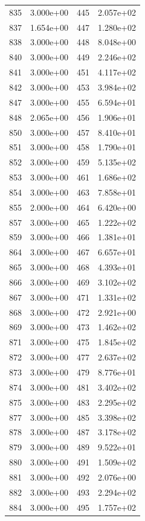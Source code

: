 \documentclass[12pt]{article}
\begin{document}
\begin{longtable}{@{}cccc@{}}
835 & 3.000e+00 & 445 & 2.057e+02 \\
837 & 1.654e+00 & 447 & 1.280e+02 \\
838 & 3.000e+00 & 448 & 8.048e+00 \\
840 & 3.000e+00 & 449 & 2.246e+02 \\
841 & 3.000e+00 & 451 & 4.117e+02 \\
842 & 3.000e+00 & 453 & 3.984e+02 \\
847 & 3.000e+00 & 455 & 6.594e+01 \\
848 & 2.065e+00 & 456 & 1.906e+01 \\
850 & 3.000e+00 & 457 & 8.410e+01 \\
851 & 3.000e+00 & 458 & 1.790e+01 \\
852 & 3.000e+00 & 459 & 5.135e+02 \\
853 & 3.000e+00 & 461 & 1.686e+02 \\
854 & 3.000e+00 & 463 & 7.858e+01 \\
855 & 2.000e+00 & 464 & 6.420e+00 \\
857 & 3.000e+00 & 465 & 1.222e+02 \\
859 & 3.000e+00 & 466 & 1.381e+01 \\
864 & 3.000e+00 & 467 & 6.657e+01 \\
865 & 3.000e+00 & 468 & 4.393e+01 \\
866 & 3.000e+00 & 469 & 3.102e+02 \\
867 & 3.000e+00 & 471 & 1.331e+02 \\
868 & 3.000e+00 & 472 & 2.921e+00 \\
869 & 3.000e+00 & 473 & 1.462e+02 \\
871 & 3.000e+00 & 475 & 1.845e+02 \\
872 & 3.000e+00 & 477 & 2.637e+02 \\
873 & 3.000e+00 & 479 & 8.776e+01 \\
874 & 3.000e+00 & 481 & 3.402e+02 \\
875 & 3.000e+00 & 483 & 2.295e+02 \\
877 & 3.000e+00 & 485 & 3.398e+02 \\
878 & 3.000e+00 & 487 & 3.178e+02 \\
879 & 3.000e+00 & 489 & 9.522e+01 \\
880 & 3.000e+00 & 491 & 1.509e+02 \\
881 & 3.000e+00 & 492 & 2.076e+00 \\
882 & 3.000e+00 & 493 & 2.294e+02 \\
884 & 3.000e+00 & 495 & 1.757e+02 \\

\end{longtable}
\end{document}

